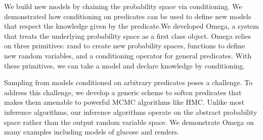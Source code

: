 We build new models by chaining the probability space via
conditioning. We demonstrated how conditioning on predicates can be
used to define new models that respect the knowledge given by the predicate.We developed Omega, a system that treats the underlying probability
space as a first class object. Omega relies on three primitives:
rand to create new probability spaces, functions to define new random variables, and a conditioning operator for general predicates. With these primitives, we can take a model and declare knowledge by conditioning. 

Sampling from models conditioned on arbitrary predicates poses a challenge. To address this challenge, we develop a generic scheme to soften predicates that makes them amenable to powerful MCMC algorithms like HMC. Unlike most inference algorithms, our inference algorithms operate on the abstract probability space rather than the output random variable space. 
We demonstrate Omega on many examples including models of glucose and renders.






